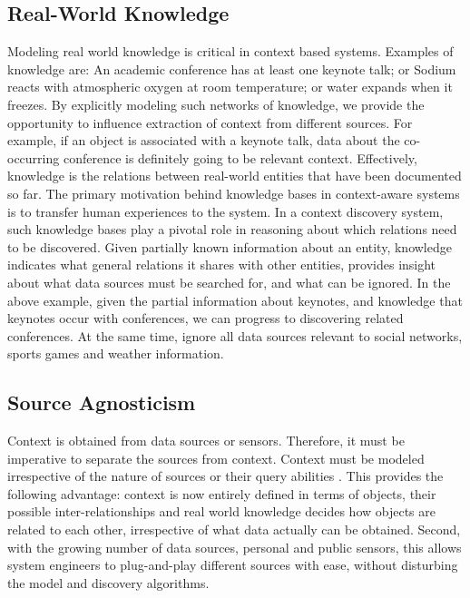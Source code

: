 \subsection{Real-World Knowledge}
Modeling real world knowledge is critical in context based systems. Examples of knowledge are: An academic conference has at least one keynote talk; or Sodium reacts with atmospheric oxygen at room temperature; or water expands when it freezes. By explicitly modeling such networks of knowledge, we provide the opportunity to influence extraction of context from different sources. For example, if an object is associated with a keynote talk, data about the co-occurring conference is definitely going to be relevant context. Effectively, knowledge is the relations between real-world entities that have been documented so far. The primary motivation behind knowledge bases in context-aware systems is to transfer human experiences to the system. In a context discovery system, such knowledge bases play a pivotal role in reasoning about which relations need to be discovered. Given partially known information about an entity, knowledge indicates what general relations it shares with other entities, provides insight about what data sources must be searched for, and what can be ignored. In the above example, given the partial information about keynotes, and knowledge that keynotes occur with conferences, we can progress to discovering related conferences. At the same time, ignore all data sources relevant to social networks, sports games and weather information.


\subsection{Source Agnosticism}
Context is obtained from data sources or sensors. Therefore, it must be imperative to separate the sources from context. Context must be modeled irrespective of the nature of sources or their query abilities \cite{yerneni1999computing}. This provides the following advantage: context is now entirely defined in terms of objects, their possible inter-relationships and real world knowledge decides how objects are related to each other, irrespective of what data actually can be obtained. Second, with the growing number of data sources, personal and public sensors, this allows system engineers to plug-and-play different sources with ease, without disturbing the model and discovery algorithms.

